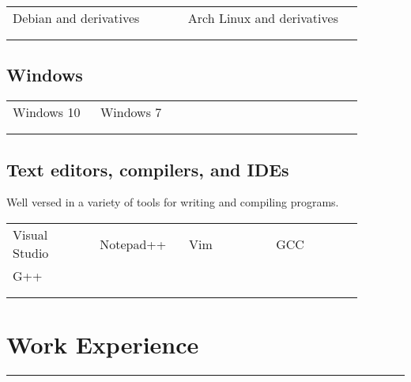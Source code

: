 \documentclass[letterpaper]{article}
\newcommand{\horizontalLine}{%
    \rule{\linewidth}{0.2pt}
    \vspace{1ex}
}
\begin{document}
        \begin{tabular}{p{0.44\linewidth} p{0.44\linewidth}}
            \\
            Debian and derivatives & Arch Linux and derivatives \\
            \\
            \\
        \end{tabular}

        \subsection*{Windows}

        \begin{tabular}{p{0.22\linewidth} p{0.22\linewidth} p{0.22\linewidth} p{0.22\linewidth}}
            \\
            Windows 10 & Windows 7 \\
            \\
            \\
        \end{tabular}

        \subsection*{Text editors, compilers, and IDEs}
        Well versed in a variety of tools for writing and compiling programs.

        \begin{tabular}{p{0.22\linewidth} p{0.22\linewidth} p{0.22\linewidth} p{0.22\linewidth}}
            \\
            Visual Studio & Notepad++ & Vim & GCC \\
            G++ \\
            \\
            \\
        \end{tabular}

    \section*{Work Experience}

        \horizontalLine
\end{document}
